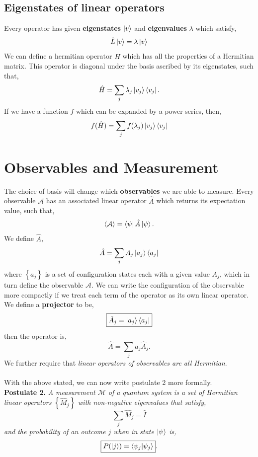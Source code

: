 \documentclass{book}
\begin{document}
\subsection{Eigenstates of linear operators}
Every operator has given \textbf{eigenstates} $\ket{v}$ and \textbf{eigenvalues} $\lambda$ which satisfy,
\begin{equation}
	\hat{L}\ket{v} = \lambda \ket{v}
\end{equation}
We can define a hermitian operator $\hat{H}$ which has all the properties of a Hermitian matrix. This operator is diagonal under the basis ascribed by its eigenstates, such that,
\begin{equation}
	\hat{H} = \sum_j \lambda_j\ket{v_j}\bra{v_j}.
\end{equation}
If we have a function $f$ which can be expanded by a power series, then,
\begin{equation}
	f(\hat{H}) = \sum_jf(\lambda_j)\ket{v_j}\bra{v_j}
\end{equation}
\section{Observables and Measurement}
The choice of basis will change which \textbf{observables} we are able to measure. Every observable $\mathcal{A}$ has an associated linear operator $\hat{A}$ which returns its expectation value, such that,
\begin{equation}
	\left<\mathcal{A}\right> = \bra{\psi}\hat{A}\ket{\psi}.
\end{equation}
We define $\hat{A}$,
\begin{equation}
	\hat{A} = \sum_j A_j\ket{a_j}\bra{a_j}
\end{equation}
where $\left\{a_j\right\}$ is a set of configuration states each with a given value $A_j$, which in turn define the observable $\mathcal{A}$. We can write the configuration of the observable more compactly if we treat each term of the operator as its own linear operator. We define a \textbf{projector} to be,
\begin{equation}
	\boxed{\hat{A}_j = \ket{a_j}\bra{a_j}}
\end{equation}
then the operator is,
\begin{equation}
	\boxed{\hat{A} = \sum_j a_j\hat{A}_j}.
\end{equation}
We further require that \textit{linear operators of observables are all Hermitian}.
\\\\
With the above stated, we can now write postulate 2 more formally.
\\
\textbf{Postulate 2.} \textit{A measurement $\mathcal{M}$ of a quantum system is a set of Hermitian linear operators $\left\{\hat{M}_j\right\}$ with non-negative eigenvalues that satisfy,
	\begin{equation}
		\sum_j \hat{M}_j = \hat{I}
	\end{equation}
and the probability of an outcome $j$ when in state $\ket{\psi}$ is,
\begin{equation}
	\boxed{P(\ket{j}) = \braket{\psi_j}{\psi_j}}.
\end{equation}
}
\end{document}
